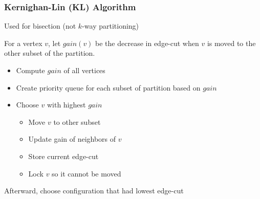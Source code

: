 \documentclass{beamer}
\begin{document}
\begin{frame}
  \frametitle{Kernighan-Lin (KL) Algorithm}

  Used for bisection (not $k$-way partitioning)

  For a vertex $v$, let $gain(v)$ be the decrease in edge-cut when $v$ is moved to the other subset of the partition.

  \begin{itemize}
    \item Compute $gain$ of all vertices
    \item Create priority queue for each subset of partition based on $gain$
    \item Choose $v$ with highest $gain$
      \begin{itemize}
        \item Move $v$ to other subset
        \item Update gain of neighbors of $v$
        \item Store current edge-cut
        \item Lock $v$ so it cannot be moved
      \end{itemize}
  \end{itemize}

  Afterward, choose configuration that had lowest edge-cut

\end{frame}
\end{document}
